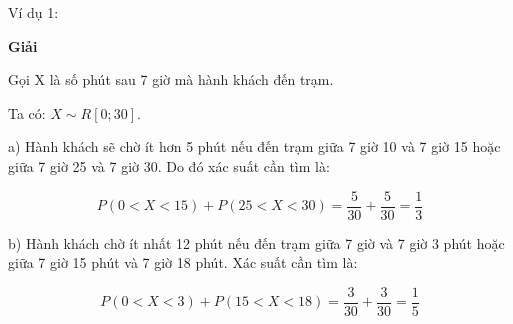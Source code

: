 \newline

\noindent Ví dụ 1:


\textbf{Giải}

Gọi X là số phút sau 7 giờ mà hành khách đến trạm.

Ta có: $X \sim R[0;30]$.

a) Hành khách sẽ chờ ít hơn 5 phút nếu đến trạm giữa 7 giờ 10 và 7 giờ 15 hoặc giữa 7 giờ 25 và 7 giờ 30. Do đó xác suất cần tìm là:

$$P(0<X<15) + P(25<X<30)=\frac{5}{30} + \frac{5}{30}=\frac{1}{3}$$

b) Hành khách chờ ít nhất 12 phút nếu đến trạm giữa 7 giờ và 7 giờ 3 phút hoặc giữa 7 giờ 15 phút và 7 giờ 18 phút. Xác suất cần tìm là:

$$P(0<X<3) + P(15<X<18)=\frac{3}{30} + \frac{3}{30}=\frac{1}{5}$$
